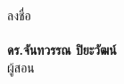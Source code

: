 \vspace{7mm}
\noindent
\hangindent=9cm
ลงชื่อ\\
\vspace{10mm}\\
\textbf{ดร.จันทวรรณ ปิยะวัฒน์}\\
ผู้สอน



